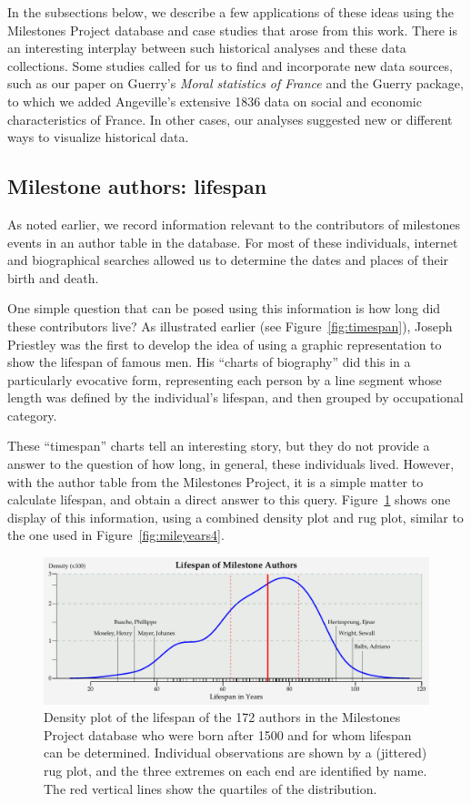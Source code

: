 \documentclass[11pt]{article}
\newcommand*{\figref}[1]{Figure~\ref{#1}}
\begin{document}
In the subsections below, we describe a few applications of these ideas using the Milestones Project database and case studies that arose from this work. There is an interesting interplay between such historical analyses and these data collections. Some studies called for us to find and incorporate new data sources, such as our paper \citep{Friendly:2007:guerry} on Guerry's \emph{Moral statistics of France} and the Guerry package, to which we added Angeville's extensive 1836 data on social and economic characteristics of France. In other cases, our analyses suggested new or different ways to visualize historical data.

\subsection{Milestone authors: lifespan}\label{sec:lifespan}
As noted earlier, we record information relevant to the contributors of milestones events in an author table in the database. For most of these individuals, internet and biographical searches allowed us to determine the dates and places of their birth and death.

One simple question that can be posed using this information is how long did these contributors live? As illustrated earlier (see \figref{fig:timespan}), Joseph Priestley was the first to develop the idea of using a graphic representation to show the lifespan of famous men. His ``charts of biography'' did this in a particularly evocative form, representing each person by a line segment whose length was defined by the individual's lifespan, and then grouped by occupational category. 

These ``timespan'' charts tell an interesting story, but they do not provide a answer to the question of how long, in general, these individuals lived.  However, with the author table from the Milestones Project, it is a simple matter to calculate lifespan, and obtain a direct answer to this query. \figref{fig:lifespan} shows one display of this information, using a combined density plot and rug plot, similar to the one used in \figref{fig:mileyears4}.

\begin{figure}[!htb]
  \centering
  \includegraphics[width=\textwidth,clip]{fig/lifespan3}
  \caption{Density plot of the lifespan of the 172 authors in the Milestones Project database who were born after 1500 and for whom lifespan can be determined. Individual observations are shown by a (jittered) rug plot, and the three extremes on each end are identified by name.  The red vertical lines show the quartiles of the distribution.}
  \label{fig:lifespan}
\end{figure}
\end{document}
